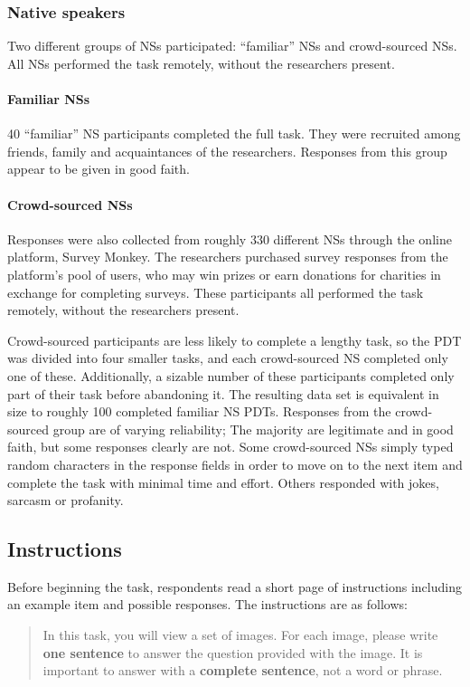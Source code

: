 \documentclass[12pt,notitlepage]{article}
\begin{document}
\subsubsection{Native speakers}
Two different groups of NSs participated: ``familiar'' NSs and crowd-sourced NSs. All NSs performed the task remotely, without the researchers present.

\paragraph{Familiar NSs}
40 ``familiar'' NS participants completed the full task. They were recruited among friends, family and acquaintances of the researchers. Responses from this group appear to be given in good faith.

\paragraph{Crowd-sourced NSs}
Responses were also collected from roughly 330 different NSs through the online platform, Survey Monkey. The researchers purchased survey responses from the platform's pool of users, who may win prizes or earn donations for charities in exchange for completing surveys. These participants all performed the task remotely, without the researchers present.

Crowd-sourced participants are less likely to complete a lengthy task, so the PDT was divided into four smaller tasks, and each crowd-sourced NS completed only one of these. Additionally, a sizable number of these participants completed only part of their task before abandoning it. The resulting data set is equivalent in size to roughly 100 completed familiar NS PDTs. Responses from the crowd-sourced group are of varying reliability; The majority are legitimate and in good faith, but some responses clearly are not. Some crowd-sourced NSs simply typed random characters in the response fields in order to move on to the next item and complete the task with minimal time and effort. Others responded with jokes, sarcasm or profanity.

\subsection{Instructions} 
Before beginning the task, respondents read a short page of instructions including an example item and possible responses. The instructions are as follows:

\begin{quotation}\noindent
In this task, you will view a set of images. For each image, please write \textbf{one sentence} to answer the question provided with the image. It is important to answer with a \textbf{complete sentence}, not a word or phrase.
\end{quotation}
\end{document}
